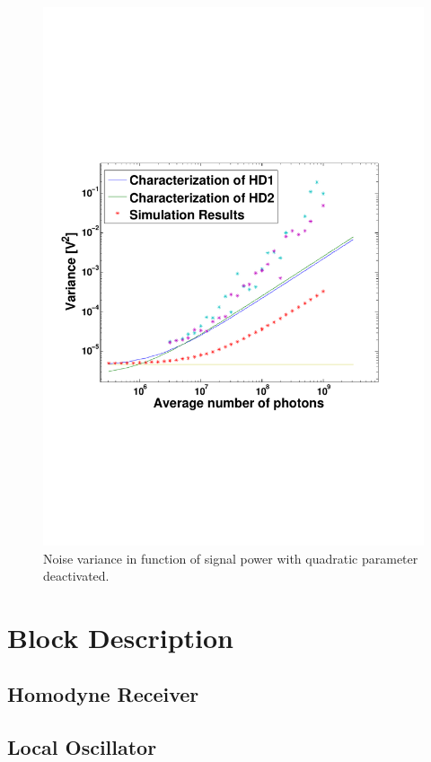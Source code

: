 \documentclass[a4paper]{article}
\begin{document}
\begin{figure}[h]
\centering
\includegraphics[width=\linewidth, trim= 0mm 60mm 0mm 70mm]{simulationresults2.pdf}
\caption{Noise variance in function of signal power with quadratic parameter deactivated.}
\label{fig:withoutquad}
\end{figure}

\section{Block Description}

\subsection{Homodyne Receiver}


\subsection{Local Oscillator}

\end{document}
